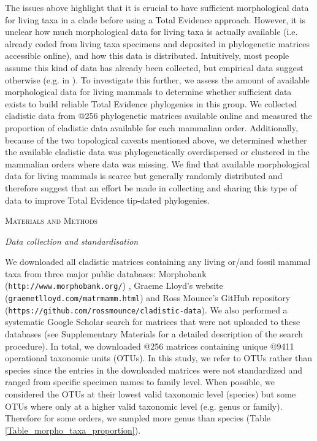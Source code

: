 \documentclass[12pt,letterpaper]{article}
\renewcommand{\section}[1]{%
\bigskip
\begin{center}
\begin{Large}
\normalfont\scshape #1
\medskip
\end{Large}
\end{center}}
\renewcommand{\subsection}[1]{%
\bigskip
\begin{center}
\begin{large}
\normalfont\itshape #1
\end{large}
\end{center}}
\begin{document}
The issues above highlight that it is crucial to have sufficient morphological data for living taxa in a clade before using a Total Evidence approach.
However, it is unclear how much morphological data for living taxa is actually available (i.e. already coded from living taxa specimens and deposited in phylogenetic matrices accessible online), and how this data is distributed.
Intuitively, most people assume this kind of data has already been collected, but empirical data suggest otherwise (e.g. in \cite{ronquista2012,slaterphylogenetic2013,beckancient2014}).
To investigate this further, we assess the amount of available morphological data for living mammals to determine whether sufficient data exists to build reliable Total Evidence phylogenies in this group.
We collected cladistic data from @256 phylogenetic matrices available online and measured the proportion of cladistic data available for each mammalian order.
Additionally, because of the two topological caveats mentioned above, we determined whether the available cladistic data was phylogenetically overdispersed or clustered in the mammalian orders where data was missing. 
We find that available morphological data for living mammals is scarce but generally randomly distributed and therefore suggest that an effort be made in collecting and sharing this type of data to improve Total Evidence tip-dated phylogenies.

%
%

\section{Materials and Methods}
\subsection{Data collection and standardisation}
We downloaded all cladistic matrices containing any living or/and fossil mammal taxa from three major public databases: Morphobank (\texttt{http://www.morphobank.org/}) \citep{morphobank}, Graeme Lloyd's website (\texttt{graemetlloyd.com/matrmamm.html}) and Ross Mounce's GitHub repository (\texttt{https://github.com/rossmounce/cladistic-data}).
We also performed a systematic Google Scholar search for matrices that were not uploaded to these databases (see Supplementary Materials for a detailed description of the search procedure).
In total, we downloaded @256 %
matrices containing unique @9411 %
operational taxonomic units (OTUs).
In this study, we refer to OTUs rather than species since the entries in the downloaded matrices were not standardized and ranged from specific specimen names to family level.
When possible, we considered the OTUs at their lowest valid taxonomic level (species) but some OTUs where only at a higher valid taxonomic level (e.g. genus or family).
Therefore for some orders, we sampled more genus than species (Table \ref{Table_morpho_taxa_proportion}).
\end{document}

